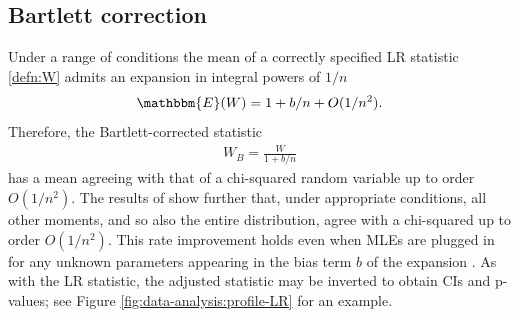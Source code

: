 \documentclass[12pt]{article}
\newcommand{\E}{\mathbbm{E}}
\newcommand{\n}{n}
\newcommand{\W}{W}
\newcommand{\WB}{W_B}
\begin{document}
\subsection{Bartlett correction}

Under a range of conditions the mean of a correctly specified LR statistic \eqref{defn:W} admits an expansion in integral powers of $1/\n$ \citep{barndorff:84}
\begin{align}
  \E(\W)  = 1 + b/\n + O(1/\n^2).
\end{align}
Therefore, the Bartlett-corrected statistic
\begin{align}
  \WB = \frac{\W}{1+b/\n}
  \label{defn:WB}
\end{align}
has a mean agreeing with that of a chi-squared random variable up to order $O(1/\n^2)$.
The results of \citet{bartlett:37,lawley:56} show further that, under
appropriate conditions, all other moments, and so also the entire
distribution, agree with a chi-squared up to order
$O(1/\n^2)$. This rate improvement holds even when  MLEs are plugged in for any unknown parameters appearing in the  bias term $b$ of the expansion \citep{barndorff:88}.
As with the LR statistic, the
adjusted statistic may be inverted to obtain CIs and
p-values; see Figure \ref{fig:data-analysis:profile-LR} for an example. %
\end{document}
